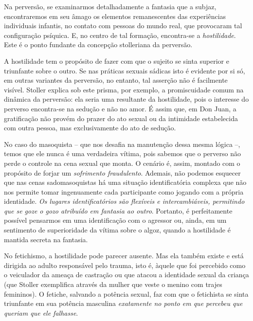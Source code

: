 Na perversão, se examinarmos detalhadamente a fantasia que a subjaz,
encontraremos em seu âmago os elementos remanescentes das experiências
individuais infantis, no contato com pessoas do mundo real, que
provocaram tal configuração psíquica. E, no centro de tal formação,
encontra-se a \emph{hostilidade}. Este é o ponto fundante da concepção
stolleriana da perversão.

A hostilidade tem o propósito de fazer com que o sujeito se sinta
superior e triunfante sobre o outro. Se nas práticas sexuais sádicas
isto é evidente por si só, em outras variantes da perversão, no entanto,
tal asserção não é facilmente visível. Stoller explica sob este prisma,
por exemplo, a promiscuidade comum na dinâmica da perversão: ela seria
uma resultante da hostilidade, pois o interesse do perverso encontra-se
na sedução e não no amor. É assim que, em Don Juan, a gratificação não
provém do prazer do ato sexual ou da intimidade estabelecida com outra
pessoa, mas exclusivamente do ato de sedução.

No caso do masoquista -- que nos desafia na manutenção dessa mesma
lógica --, temos que ele nunca é uma verdadeira vítima, pois sabemos que
o perverso não perde o controle na cena sexual que monta. O cenário é,
assim, montado com o propósito de forjar um \emph{sofrimento
fraudulento}. Ademais, não podemos esquecer que nas cenas
sadomasoquistas há uma situação identificatória complexa que não nos
permite tomar ingenuamente cada participante como jogando com a própria
identidade. \emph{Os lugares identificatórios são flexíveis e
intercambiáveis, permitindo que se goze o gozo atribuído em fantasia ao
outro}. Portanto, é perfeitamente possível pensarmos em uma
identificação com o agressor ou, ainda, em um sentimento de
superioridade da vítima sobre o algoz, quando a hostilidade é mantida
secreta na fantasia.

No fetichismo, a hostilidade pode parecer ausente. Mas ela também existe
e está dirigida ao adulto responsável pelo trauma, isto é, àquele que
foi percebido como o veiculador da ameaça de castração ou que atacou a
identidade sexual da criança (que Stoller exemplifica através da mulher
que veste o menino com trajes femininos). O fetiche, salvando a potência
sexual, faz com que o fetichista se sinta triunfante em sua potência
masculina \emph{exatamente no ponto em que percebeu que queriam que ele
falhasse}.

